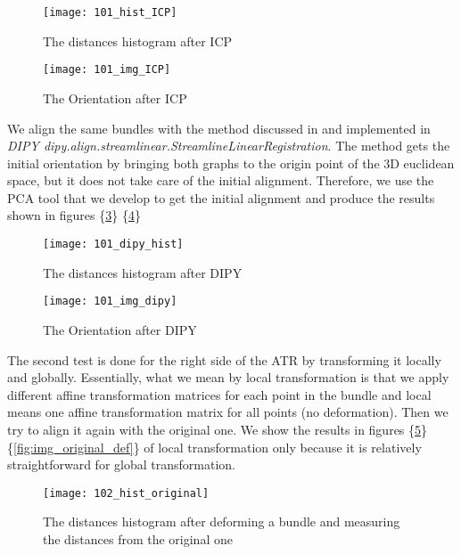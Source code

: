 \documentclass[../structure.tex]{subfiles}
\begin{document}
\begin{figure}[h!]
\centering
\texttt{[image: 101\_hist\_ICP]}
\captionsetup{justification=centering}
\caption{The distances histogram after ICP}
\label{fig:hist_ICP}
\end{figure}

\begin{figure}[h!]
\centering
\texttt{[image: 101\_img\_ICP]}
\captionsetup{justification=centering}
\caption{The Orientation after ICP}
\label{fig:img_ICP}
\end{figure}
\pagebreak
We align the same bundles with the method discussed in \cite{ODonnell2012} and implemented in \textit{DIPY dipy.align.streamlinear.StreamlineLinearRegistration}. The method gets the initial orientation by bringing both graphs to the origin point of the 3D euclidean space, but it does not take care of the initial alignment. Therefore, we use the PCA tool that we develop to get the initial alignment and produce the results shown in figures \{\ref{fig:dipy_hist}\} \{\ref{fig:img_dipy}\}

\begin{figure}[h!]
\centering
\texttt{[image: 101\_dipy\_hist]}
\captionsetup{justification=centering}
\caption{The distances histogram after DIPY}
\label{fig:dipy_hist}
\end{figure}

\begin{figure}[h!]
\centering
\texttt{[image: 101\_img\_dipy]}
\captionsetup{justification=centering}
\caption{The Orientation after DIPY}
\label{fig:img_dipy}
\end{figure}
\pagebreak

The second test is done for the right side of the ATR by transforming it locally and globally. Essentially, what we mean by local transformation is that we apply different affine transformation matrices for each point in the bundle and local means one affine transformation matrix for all points (no deformation). Then we try to align it again with the original one. We show the results in figures \{\ref{fig:hist_original_def}\} \{\ref{fig:img_original_def}\} of local transformation only because it is relatively straightforward for global transformation.

\begin{figure}[h!]
\centering
\texttt{[image: 102\_hist\_original]}
\captionsetup{justification=centering}
\caption{The distances histogram after deforming a bundle and measuring the distances from the original one}
\label{fig:hist_original_def}
\end{figure}
\end{document}
